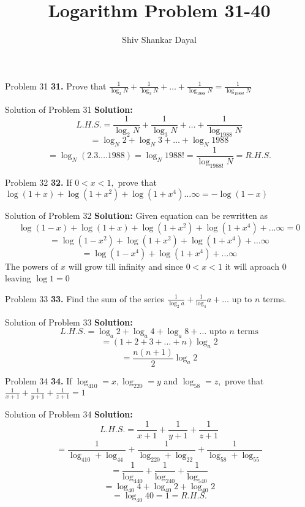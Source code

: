 \documentclass[aspectratio=1610,8pt]{beamer}
\title{Logarithm Problem 31-40}
\author[Shiv Shankar Dayal]{Shiv Shankar Dayal}
\begin{document}
\begin{frame}
  \titlepage
\end{frame}
\begin{frame}{Problem 31}
  \textbf{31.} Prove that $\frac{1}{\log_2N} + \frac{1}{\log_3N} + \ldots + \frac{1}{\log_{1988}N} = \frac{1}{\log_{1988!}N}$
\end{frame}
\begin{frame}{Solution of Problem 31}
  \textbf{Solution:} $$L.H.S. = \frac{1}{\log_2N} + \frac{1}{\log_3N} + \ldots + \frac{1}{\log_{1988}N}$$
  $$= \log_N2 + \log_N3 + \ldots + \log_N1988$$
  $$= \log_N(2.3.\ldots 1988) = \log_N1988! = \frac{1}{\log_{1988!}N} = R.H.S.$$
\end{frame}
\begin{frame}{Problem 32}
  \textbf{32.} If $0 < x < 1,$ prove that $\log(1 + x) + \log(1 + x^2) + \log(1 + x^4)\ldots\infty = -\log(1 - x)$
\end{frame}
\begin{frame}{Solution of Problem 32}
  \textbf{Solution:} Given equation can be rewritten as
  $$\log(1 - x) + \log(1 + x) + \log(1 + x^2) + \log(1 + x^4) + \ldots\infty = 0$$
  $$= \log(1 - x^2) + \log(1 + x^2) + \log(1 + x^4) + \ldots\infty$$
  $$= \log(1 - x^4) + \log(1 + x^4) + \ldots\infty$$
  The powers of $x$ will grow till infinity and since $0 < x < 1$ it will aproach $0$ leaving $\log 1 = 0$
\end{frame}
\begin{frame}{Problem 33}
  \textbf{33.} Find the sum of the series $\frac{1}{\log_2a} + \frac{1}{\log_4}a + \ldots$ up to $n$ terms.
\end{frame}
\begin{frame}{Solution of Problem 33}
  \textbf{Solution:} $$L.H.S. = \log_a2 + \log_a4 + \log_a8 + \ldots \text{~upto~}n\text{~terms}$$
  $$= (1 + 2 + 3+ \ldots + n)\log_a2$$
  $$= \frac{n(n + 1)}{2}\log_a2$$
\end{frame}
\begin{frame}{Problem 34}
  \textbf{34.} If $\log_410 = x, \log_220 = y$ and $\log_58 = z,$ prove that $\frac{1}{x + 1} + \frac{1}{y + 1} + \frac{1}{z + 1} = 1$
\end{frame}
\begin{frame}{Solution of Problem 34}
  \textbf{Solution:} $$L.H.S. = \frac{1}{x + 1} + \frac{1}{y + 1} + \frac{1}{z + 1}$$
  $$= \frac{1}{\log_410 + \log_44} + \frac{1}{\log_220 + \log_22} + \frac{1}{\log_58 + \log_55}$$
  $$= \frac{1}{\log_440} + \frac{1}{\log_240} + \frac{1}{\log_540}$$
  $$= \log_{40}4 + \log_{40}2 + \log_{40}2$$
  $$= \log_{40}40 = 1 = R.H.S.$$
\end{frame}
\end{document}
